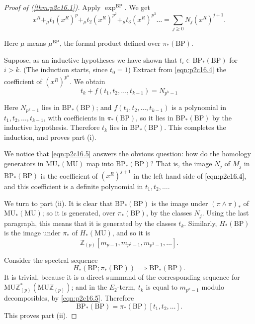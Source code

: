 \documentclass[../main]{subfiles}
\begin{document}
\begin{proof}[Proof of (\ref{thm:p2c16.1})]
Apply $\exp^{\mathrm{BP}}$. We get 
\begin{equation}
\tag{16.4}
\label{eqn:p2c16.4}
x^R +_\mu t_1 (x^R)^p +_\mu t_2 (x^R)^{p^2} +_\mu t_3 (x^R)^{p^3} \ldots = \sum_{j \ge 0} N_j (x^R)^{j + 1}.
\end{equation}

Here $\mu$ means $\mu^{\mathrm{BP}}$, the formal product defined over $\pi_*(\mathrm{BP})$.

Suppose, as an inductive hypotheses we have shown that $t_i \in \mathrm{BP}_*(\mathrm{BP})$ for $i > k$. (The induction starts, since $t_0 = 1$) Extract from \eqref{eqn:p2c16.4} the coefficient of $(x^R)^{p^k}$. We obtain
\begin{equation}
\tag{16.5}
\label{eqn:p2c16.5}
t_k + f(t_1, t_2, \ldots, t_{k - 1}) = N_{p^k - 1}
\end{equation}

Here $N_{p^k - 1}$ lies in $\mathrm{BP}_\ast(\mathrm {BP})$; and $f(t_1, t_2, \ldots, t_{k-1})$ is a polynomial in \newline$t_1, t_2, \ldots, t_{k - 1}$, with coefficients in $\pi_\ast(\mathrm{BP})$, so it lies in $\mathrm{BP}_\ast(\mathrm{BP})$ by the inductive hypothesis. Therefore $t_k$ lies in $\mathrm {BP}_\ast(\mathrm{BP})$. This completes the induction, and proves part (i).

We notice that \eqref{eqn:p2c16.5} answers the obvious question: how do the homology generators in $\mathrm{MU}_\ast(\mathrm{MU})$ map into $\mathrm{BP}_\ast(\mathrm{BP})$? That is, the image $N_j$ of $M_j$ in $\mathrm{BP}_\ast(\mathrm{BP})$ is the coefficient of $(x^R)^{j + 1}$ in the left hand side of \eqref{eqn:p2c16.4}, and this coefficient is a definite polynomial in $t_1, t_2, \ldots$. 

We turn to part (ii). It is clear that $\mathrm {BP}_\ast (\mathrm {BP})$ is the image under $(\pi \wedge \pi)_\ast$ of $\mathrm{MU}_\ast(\mathrm{MU})$; so it is generated, over $\pi_\ast(\mathrm{BP})$, by the classes $N_j$. Using the last paragraph, this means that it is generated by the classes $t_k$. Similarly, $H_\ast(\mathrm{BP})$ is the image under $\pi_\ast$ of $H_\ast(\mathrm{MU})$, and so it is \[\mathbb Z_{(p)}[m_{p - 1}, m_{p^2 - 1}, m_{p^3 - 1}, \ldots].\] 

Consider the spectral sequence \[H_\ast(\mathrm{BP}; \pi_\ast(\mathrm {BP})) \implies \mathrm{BP}_\ast(\mathrm{BP}).\] It is trivial, because it is a direct summand of the corresponding sequence for $\mathrm {MU} \mathbb Z_{(p)}^\ast(\mathrm {MU} \mathbb Z_{(p)})$; and in the $E_2$-term, $t_k$ is equal to $m_{p^k - 1}$ modulo decomposibles, by \eqref{eqn:p2c16.5}. Therefore \[\mathrm{BP}_\ast (\mathrm {BP}) = \pi_*(\mathrm {BP}) [t_1, t_2, \ldots].\] This proves part (ii).


\end{proof}
\end{document}

